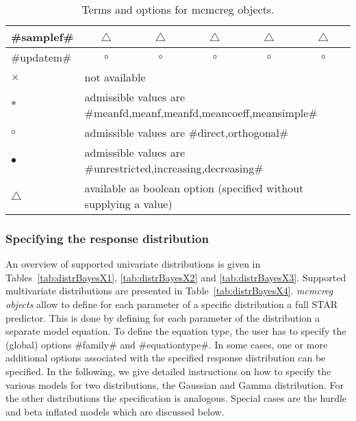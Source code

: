 \begin{sidewaystable}
\begin{tabular}{|l||c|c|c|c|c|}
\hline
#samplef#  & $\triangle$ & $\triangle$  & $\triangle$  & $\triangle$ & $\triangle$  \\
\hline
#updatem#  & $\circ$ & $\circ$  & $\circ$  & $\circ$ & $\circ$  \\
\hline
$\times$    & \multicolumn{5}{l|}{not available} \\
\hline
$\ast$  & \multicolumn{5}{l|}{admissible values are #meanfd,meanf,meanfd,meancoeff,meansimple#} \\
\hline
$\circ$  & \multicolumn{5}{l|}{admissible values are #direct,orthogonal#} \\
\hline
$\bullet$  & \multicolumn{5}{l|}{admissible values are #unrestricted,increasing,decreasing#} \\
\hline
$\triangle$   & \multicolumn{5}{l|}{available as boolean option (specified without supplying a value)} \\
\hline
\end{tabular}
{\em\centering \caption{\label{mcmctermsoptions} Terms and options for mcmcreg objects.}}
\end{sidewaystable}




\clearpage

\subsubsection{Specifying the response distribution}
 \label{mcmcregfamilysyntax}

An overview of supported univariate distributions is given in Tables~\ref{tab:distrBayesX1}, \ref{tab:distrBayesX2} and \ref{tab:distrBayesX3}.
Supported multivariate distributions are presented in Table~\ref{tab:distrBayesX4}.
{\em mcmcreg objects}
allow to define for each parameter of a specific distribution a full STAR predictor. This is done
by defining for each parameter of the distribution a separate model equation. To define the equation
type, the user has to specify the (global) options #family# and #equationtype#.
In some cases, one or more additional
options associated with the specified response distribution can be
specified. In the following,
we give detailed instructions on how to specify the various
models for two distributions, the Gaussian and Gamma distribution. For the other distributions
the specification is analogous. Special cases are the hurdle and beta inflated models which are discussed below.






